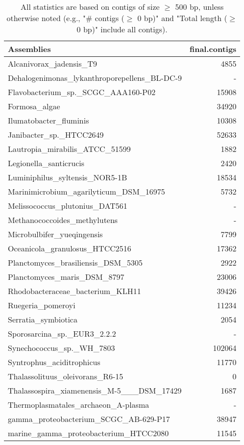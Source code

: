 \documentclass[12pt,a4paper]{article}
\begin{document}
\begin{table}[ht]
\begin{center}
\caption{All statistics are based on contigs of size $\geq$ 500 bp, unless otherwise noted (e.g., "\# contigs ($\geq$ 0 bp)" and "Total length ($\geq$ 0 bp)" include all contigs).}
\begin{tabular}{|l*{1}{|r}|}
\hline
Assemblies & final.contigs \\ \hline
Alcanivorax\_jadensis\_T9 & 4855 \\ \hline
Dehalogenimonas\_lykanthroporepellens\_BL-DC-9 & - \\ \hline
Flavobacterium\_sp.\_SCGC\_AAA160-P02 & 15908 \\ \hline
Formosa\_algae & 34920 \\ \hline
Ilumatobacter\_fluminis & 10308 \\ \hline
Janibacter\_sp.\_HTCC2649 & 52633 \\ \hline
Lautropia\_mirabilis\_ATCC\_51599 & 1882 \\ \hline
Legionella\_santicrucis & 2420 \\ \hline
Luminiphilus\_syltensis\_NOR5-1B & 18534 \\ \hline
Marinimicrobium\_agarilyticum\_DSM\_16975 & 5732 \\ \hline
Melissococcus\_plutonius\_DAT561 & - \\ \hline
Methanococcoides\_methylutens & - \\ \hline
Microbulbifer\_yueqingensis & 7799 \\ \hline
Oceanicola\_granulosus\_HTCC2516 & 17362 \\ \hline
Planctomyces\_brasiliensis\_DSM\_5305 & 2922 \\ \hline
Planctomyces\_maris\_DSM\_8797 & 23006 \\ \hline
Rhodobacteraceae\_bacterium\_KLH11 & 39426 \\ \hline
Ruegeria\_pomeroyi & 11234 \\ \hline
Serratia\_symbiotica & 2054 \\ \hline
Sporosarcina\_sp.\_EUR3\_2.2.2 & - \\ \hline
Synechococcus\_sp.\_WH\_7803 & 102064 \\ \hline
Syntrophus\_aciditrophicus & 11770 \\ \hline
Thalassolituus\_oleivorans\_R6-15 & 0 \\ \hline
Thalassospira\_xiamenensis\_M-5\_\_\_DSM\_17429 & 1687 \\ \hline
Thermoplasmatales\_archaeon\_A-plasma & - \\ \hline
gamma\_proteobacterium\_SCGC\_AB-629-P17 & 38947 \\ \hline
marine\_gamma\_proteobacterium\_HTCC2080 & 11545 \\ \hline
\end{tabular}
\end{center}
\end{table}
\end{document}
